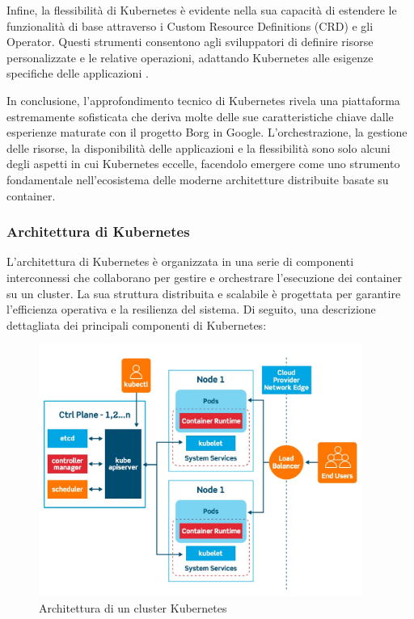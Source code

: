 Infine, la flessibilità di Kubernetes è evidente nella sua capacità di estendere le funzionalità di base attraverso i Custom Resource Definitions (CRD) e gli Operator. Questi strumenti consentono agli sviluppatori di definire risorse personalizzate e le relative operazioni, adattando Kubernetes alle esigenze specifiche delle applicazioni \cite{burns2016borg}.

In conclusione, l'approfondimento tecnico di Kubernetes rivela una piattaforma estremamente sofisticata che deriva molte delle sue caratteristiche chiave dalle esperienze maturate con il progetto Borg in Google. L'orchestrazione, la gestione delle risorse, la disponibilità delle applicazioni e la flessibilità sono solo alcuni degli aspetti in cui Kubernetes eccelle, facendolo emergere come uno strumento fondamentale nell'ecosistema delle moderne architetture distribuite basate su container.

\subsubsection{Architettura di Kubernetes}

L'architettura di Kubernetes è organizzata in una serie di componenti interconnessi che collaborano per gestire e orchestrare l'esecuzione dei container su un cluster. La sua struttura distribuita e scalabile è progettata per garantire l'efficienza operativa e la resilienza del sistema. Di seguito, una descrizione dettagliata dei principali componenti di Kubernetes:

\begin{figure}[h]
    \centering
    \includegraphics[width=400px]{figures/ch3/kube-arch.jpg}
    \caption[Architettura di un cluster Kubernetes]{Architettura di un cluster Kubernetes}
    \label{fig:cha3:k8s}
\end{figure}

